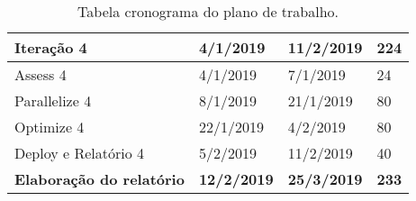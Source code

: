 \begin{table}[]
\begin{tabular}{|l|l|l|l|}
\textbf{Iteração 4}              & \textbf{4/1/2019}   & \textbf{11/2/2019}  & \textbf{224}              \\ \hline
Assess 4                         & 4/1/2019            & 7/1/2019            & 24                        \\ \hline
Parallelize 4                    & 8/1/2019            & 21/1/2019           & 80                        \\ \hline
Optimize 4                       & 22/1/2019           & 4/2/2019            & 80                        \\ \hline
Deploy e Relatório 4             & 5/2/2019            & 11/2/2019           & 40                        \\ \hline
\textbf{Elaboração do relatório} & \textbf{12/2/2019}  & \textbf{25/3/2019}  & \textbf{233}              \\ \hline
\end{tabular}
\caption{Tabela cronograma do plano de trabalho.}
\label{tabPlano}
\end{table}

